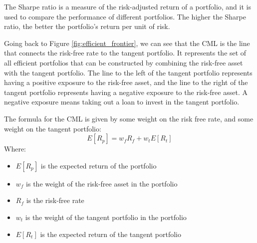 The Sharpe ratio is a measure of the risk-adjusted return of a portfolio, and it is used to compare the performance of different portfolios.
The higher the Sharpe ratio, the better the portfolio's return per unit of risk.

Going back to Figure \ref{fig:efficient_frontier}, we can see that the CML is the line that connects the risk-free rate to the tangent portfolio.
It represents the set of all efficient portfolios that can be constructed by combining the risk-free asset with the tangent portfolio.
The line to the left of the tangent portfolio represents having a positive exposure to the risk-free asset, and the line to the right of the tangent portfolio represents having a negative exposure to the risk-free asset.
A negative exposure means taking out a loan to invest in the tangent portfolio.

The formula for the CML is given by some weight on the risk free rate, and some weight on the tangent portfolio:
\begin{equation}
    \label{eq:cml}
    E[R_p] = w_f R_f + w_t E[R_t]
\end{equation}
Where:
\begin{itemize}
    \item $E[R_p]$ is the expected return of the portfolio
    \item $w_f$ is the weight of the risk-free asset in the portfolio
    \item $R_f$ is the risk-free rate
    \item $w_t$ is the weight of the tangent portfolio in the portfolio
    \item $E[R_t]$ is the expected return of the tangent portfolio
\end{itemize}

